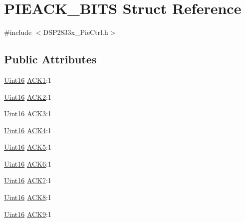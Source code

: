 \hypertarget{struct_p_i_e_a_c_k___b_i_t_s}{}\section{P\+I\+E\+A\+C\+K\+\_\+\+B\+I\+T\+S Struct Reference}
\label{struct_p_i_e_a_c_k___b_i_t_s}


{\ttfamily \#include $<$D\+S\+P2833x\+\_\+\+Pie\+Ctrl.\+h$>$}

\subsection*{Public Attributes}
\begin{DoxyCompactItemize}
\item 
\hyperlink{_d_s_p2833x___device_8h_a59a9f6be4562c327cbfb4f7e8e18f08b}{Uint16} \hyperlink{struct_p_i_e_a_c_k___b_i_t_s_acceae4974e02bdcf9df391313d4d5cb0}{A\+C\+K1}\+:1
\item 
\hyperlink{_d_s_p2833x___device_8h_a59a9f6be4562c327cbfb4f7e8e18f08b}{Uint16} \hyperlink{struct_p_i_e_a_c_k___b_i_t_s_abd40ab67bb7a3f39bd5a39dd318c498b}{A\+C\+K2}\+:1
\item 
\hyperlink{_d_s_p2833x___device_8h_a59a9f6be4562c327cbfb4f7e8e18f08b}{Uint16} \hyperlink{struct_p_i_e_a_c_k___b_i_t_s_a748230f8a785175b0882ba52fbe355bb}{A\+C\+K3}\+:1
\item 
\hyperlink{_d_s_p2833x___device_8h_a59a9f6be4562c327cbfb4f7e8e18f08b}{Uint16} \hyperlink{struct_p_i_e_a_c_k___b_i_t_s_ae8038faf071b58f4616c18b2f6dfa2a4}{A\+C\+K4}\+:1
\item 
\hyperlink{_d_s_p2833x___device_8h_a59a9f6be4562c327cbfb4f7e8e18f08b}{Uint16} \hyperlink{struct_p_i_e_a_c_k___b_i_t_s_ab915d96ff75bb4a53863f7e06cc0518e}{A\+C\+K5}\+:1
\item 
\hyperlink{_d_s_p2833x___device_8h_a59a9f6be4562c327cbfb4f7e8e18f08b}{Uint16} \hyperlink{struct_p_i_e_a_c_k___b_i_t_s_a0570964296ec8954cb5606a76d4e1b13}{A\+C\+K6}\+:1
\item 
\hyperlink{_d_s_p2833x___device_8h_a59a9f6be4562c327cbfb4f7e8e18f08b}{Uint16} \hyperlink{struct_p_i_e_a_c_k___b_i_t_s_a5e8b7573ab6e19fc40b18ccb164133de}{A\+C\+K7}\+:1
\item 
\hyperlink{_d_s_p2833x___device_8h_a59a9f6be4562c327cbfb4f7e8e18f08b}{Uint16} \hyperlink{struct_p_i_e_a_c_k___b_i_t_s_ac3e9eb6618133a02446d091fa0e6ec2c}{A\+C\+K8}\+:1
\item 
\hyperlink{_d_s_p2833x___device_8h_a59a9f6be4562c327cbfb4f7e8e18f08b}{Uint16} \hyperlink{struct_p_i_e_a_c_k___b_i_t_s_a195951f1a7fe52ecc06c580d4cd10685}{A\+C\+K9}\+:1

\end{DoxyCompactItemize}
